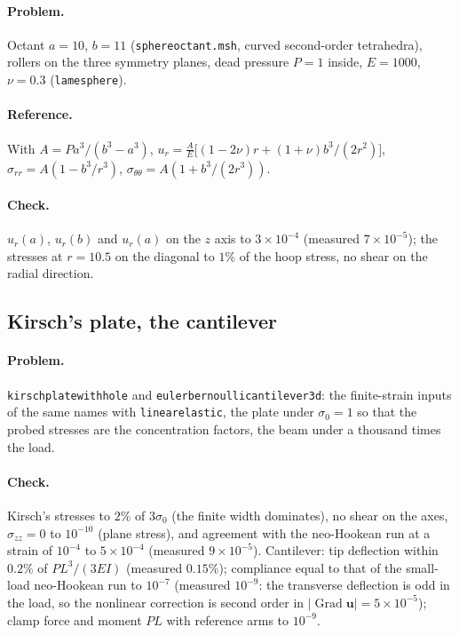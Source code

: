 \documentclass[11pt]{article}
\newcommand{\Grad}{\operatorname{Grad}}
\newcommand{\bu}{\bm{u}}
\DeclareRobustCommand{\code}[1]{{\def\_{\textunderscore\allowbreak}\texttt{#1}}}
\DeclareRobustCommand{\file}[1]{{\def\_{\textunderscore\allowbreak}\texttt{#1}}}
\begin{document}
\paragraph{Problem.}
Octant $a = 10$, $b = 11$ (\file{sphere\_octant.msh}, curved second-order
tetrahedra), rollers on the three symmetry planes, dead pressure $P = 1$
inside, $E = 1000$, $\nu = 0.3$ (\file{lame\_sphere}).

\paragraph{Reference.}
With $A = Pa^3/(b^3 - a^3)$,
$u_r = \frac{A}{E}\bigl[(1-2\nu)r + (1+\nu)b^3/(2r^2)\bigr]$,
$\sigma_{rr} = A(1 - b^3/r^3)$, $\sigma_{\theta\theta} = A(1 + b^3/(2r^3))$.

\paragraph{Check.}
$u_r(a)$, $u_r(b)$ and $u_r(a)$ on the $z$ axis to $3\times10^{-4}$ (measured
$7\times10^{-5}$); the stresses at $r = 10.5$ on the diagonal to $1\%$ of the
hoop stress, no shear on the radial direction.

\subsection{Kirsch's plate, the cantilever}

\paragraph{Problem.}
\file{kirsch\_plate\_with\_hole} and \file{euler\_bernoulli\_cantilever3d}:
the finite-strain inputs of the same names with \code{linear\_elastic}, the
plate under $\sigma_0 = 1$ so that the probed stresses are the concentration
factors, the beam under a thousand times the load.

\paragraph{Check.}
Kirsch's stresses to $2\%$ of $3\sigma_0$ (the finite width dominates), no
shear on the axes, $\sigma_{zz} = 0$ to $10^{-10}$ (plane stress), and
agreement with the neo-Hookean run at a strain of $10^{-4}$ to
$5\times10^{-4}$ (measured $9\times10^{-5}$).  Cantilever: tip deflection
within $0.2\%$ of $PL^3/(3EI)$ (measured $0.15\%$); compliance equal to that
of the small-load neo-Hookean run to $10^{-7}$ (measured $10^{-9}$: the
transverse deflection is odd in the load, so the nonlinear correction is
second order in $|\Grad\bu| = 5\times10^{-5}$); clamp force and moment
$PL$ with reference arms to $10^{-9}$.
\end{document}
